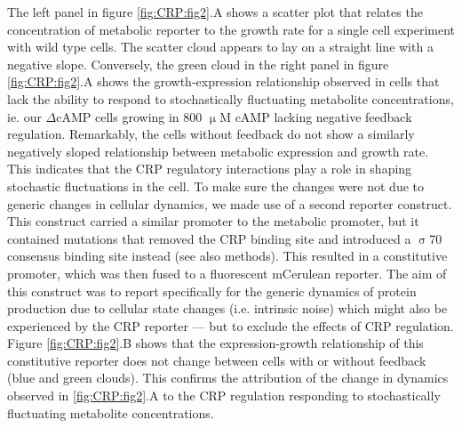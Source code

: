 %
The left panel in figure \ref{fig:CRP:fig2}.A shows a scatter plot that relates the concentration of metabolic reporter to the growth rate for a single cell experiment with wild type cells.
%
%
The scatter cloud appears to lay on a straight line with a negative slope.
%
Conversely, the green cloud in the right panel in figure \ref{fig:CRP:fig2}.A shows
the growth-expression relationship observed in cells 
that lack the ability to respond to stochastically fluctuating metabolite concentrations, ie. our $\Delta$cAMP cells growing in 800 $\upmu$M cAMP lacking negative feedback regulation.
%
Remarkably, the cells without feedback do not show a similarly negatively sloped relationship between metabolic expression and growth rate.
%
This indicates that the CRP regulatory interactions play a role in shaping stochastic fluctuations in the cell. 
%
To make sure  
the changes 
were not due to generic changes in cellular dynamics, we made use of a second reporter construct.
%
This construct carried a similar promoter to the metabolic promoter, but it contained mutations that removed the CRP binding site and introduced a $\upsigma$70 consensus binding site instead \cite{Towbin2017} (see also methods).
%
This resulted in a constitutive promoter, which was then fused to a fluorescent mCerulean reporter.
%
The aim of this construct was to report specifically for the generic dynamics of protein production due to cellular state changes (i.e. intrinsic noise)
which might also be experienced by the CRP reporter ---
%
but to exclude the effects of CRP regulation.
%
Figure \ref{fig:CRP:fig2}.B shows that the expression-growth relationship of this constitutive reporter does not change between cells with or without feedback (blue and green clouds).
This confirms the attribution of the change in dynamics observed in \ref{fig:CRP:fig2}.A to the CRP regulation responding to stochastically fluctuating metabolite concentrations.

